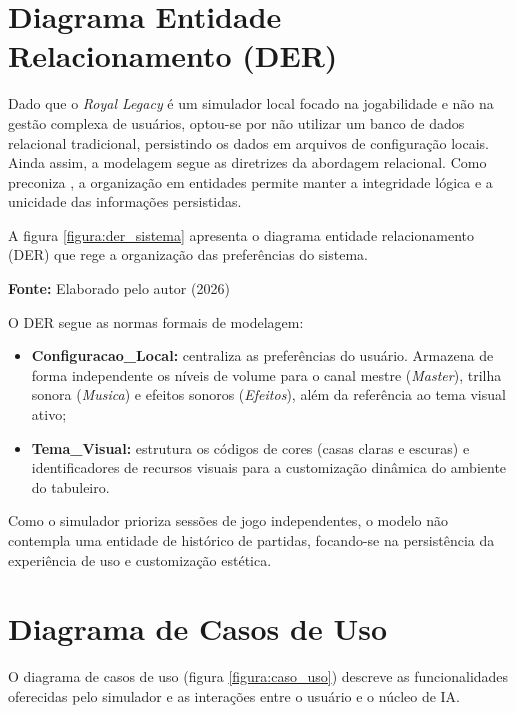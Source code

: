 \section{Diagrama Entidade Relacionamento (DER)}

Dado que o \textit{Royal Legacy} é um simulador local focado na jogabilidade e não na gestão complexa de usuários, optou-se por não utilizar um banco de dados relacional tradicional, persistindo os dados em arquivos de configuração locais. Ainda assim, a modelagem segue as diretrizes da abordagem relacional. Como preconiza , a organização em entidades permite manter a integridade lógica e a unicidade das informações persistidas.

A figura \ref{figura:der_sistema} apresenta o diagrama entidade relacionamento (DER) que rege a organização das preferências do sistema.

\begin{center}
	\vspace{-0.2cm} %
	\small \textbf{Fonte:} Elaborado pelo autor (2026)
\end{center}

O DER segue as normas formais de modelagem:
\begin{itemize}
	\item \textbf{Configuracao\_Local:} centraliza as preferências do usuário. Armazena de forma independente os níveis de volume para o canal mestre (\textit{Master}), trilha sonora (\textit{Musica}) e efeitos sonoros (\textit{Efeitos}), além da referência ao tema visual ativo;
	\item \textbf{Tema\_Visual:} estrutura os códigos de cores (casas claras e escuras) e identificadores de recursos visuais para a customização dinâmica do ambiente do tabuleiro.
\end{itemize}

Como o simulador prioriza sessões de jogo independentes, o modelo não contempla uma entidade de histórico de partidas, focando-se na persistência da experiência de uso e customização estética.

\section{Diagrama de Casos de Uso}

O diagrama de casos de uso (figura \ref{figura:caso_uso}) descreve as funcionalidades oferecidas pelo simulador e as interações entre o usuário e o núcleo de IA.

